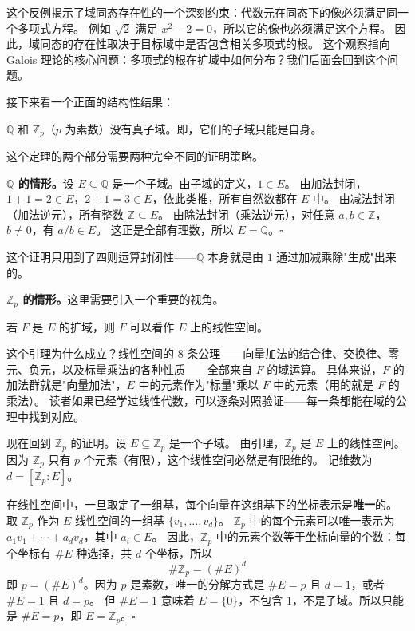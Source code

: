 这个反例揭示了域同态存在性的一个深刻约束：代数元在同态下的像必须满足同一个多项式方程。
例如 $\sqrt{2}$ 满足 $x^2 - 2 = 0$，所以它的像也必须满足这个方程。
因此，域同态的存在性取决于目标域中是否包含相关多项式的根。
这个观察指向 Galois 理论的核心问题：多项式的根在扩域中如何分布？我们后面会回到这个问题。

接下来看一个正面的结构性结果：

\begin{theorem}[素域的无真子域性质]\label{thm:no-proper-subfield}
$\mathbb{Q}$ 和 $\mathbb{Z}_p$（$p$ 为素数）没有真子域。即，它们的子域只能是自身。
\end{theorem}

这个定理的两个部分需要两种完全不同的证明策略。

\textbf{$\mathbb{Q}$ 的情形。}设 $E \subseteq \mathbb{Q}$ 是一个子域。由子域的定义，$1 \in E$。
由加法封闭，$1 + 1 = 2 \in E$，$2 + 1 = 3 \in E$，依此类推，所有自然数都在 $E$ 中。
由减法封闭（加法逆元），所有整数 $\mathbb{Z} \subseteq E$。
由除法封闭（乘法逆元），对任意 $a, b \in \mathbb{Z}$，$b \neq 0$，有 $a/b \in E$。
这正是全部有理数，所以 $E = \mathbb{Q}$。$\square$

这个证明只用到了四则运算封闭性——$\mathbb{Q}$ 本身就是由 $1$ 通过加减乘除"生成"出来的。

\textbf{$\mathbb{Z}_p$ 的情形。}这里需要引入一个重要的视角。

\begin{lemma}[扩域是线性空间]\label{lem:extension-vector-space}
若 $F$ 是 $E$ 的扩域，则 $F$ 可以看作 $E$ 上的线性空间。
\end{lemma}

这个引理为什么成立？线性空间的 8 条公理——向量加法的结合律、交换律、零元、负元，以及标量乘法的各种性质——全部来自 $F$ 的域运算。
具体来说，$F$ 的加法群就是"向量加法"，$E$ 中的元素作为"标量"乘以 $F$ 中的元素（用的就是 $F$ 的乘法）。
读者如果已经学过线性代数，可以逐条对照验证——每一条都能在域的公理中找到对应。

现在回到 $\mathbb{Z}_p$ 的证明。设 $E \subseteq \mathbb{Z}_p$ 是一个子域。
由引理，$\mathbb{Z}_p$ 是 $E$ 上的线性空间。因为 $\mathbb{Z}_p$ 只有 $p$ 个元素（有限），这个线性空间必然是有限维的。
记维数为 $d = [\mathbb{Z}_p : E]$。

在线性空间中，一旦取定了一组基，每个向量在这组基下的坐标表示是\textbf{唯一}的。
取 $\mathbb{Z}_p$ 作为 $E$-线性空间的一组基 $\{v_1, \ldots, v_d\}$。
$\mathbb{Z}_p$ 中的每个元素可以唯一表示为 $a_1 v_1 + \cdots + a_d v_d$，其中 $a_i \in E$。
因此，$\mathbb{Z}_p$ 中的元素个数等于坐标向量的个数：每个坐标有 $\#E$ 种选择，共 $d$ 个坐标，所以
\[
\#\mathbb{Z}_p = (\#E)^d
\]
即 $p = (\#E)^d$。因为 $p$ 是素数，唯一的分解方式是 $\#E = p$ 且 $d = 1$，或者 $\#E = 1$ 且 $d = p$。
但 $\#E = 1$ 意味着 $E = \{0\}$，不包含 $1$，不是子域。所以只能是 $\#E = p$，即 $E = \mathbb{Z}_p$。$\square$

